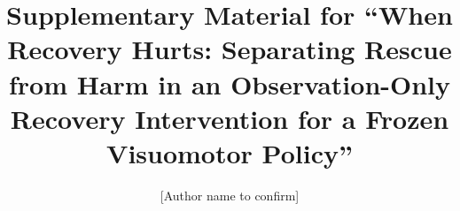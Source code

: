 \documentclass[preprint,12pt]{elsarticle}
\begin{document}
\begin{frontmatter}
\title{Supplementary Material for ``When Recovery Hurts: Separating Rescue from Harm in an Observation-Only Recovery Intervention for a Frozen Visuomotor Policy''}
\author{[Author name to confirm]}
\end{frontmatter}











\end{document}
